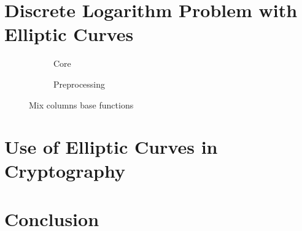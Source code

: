 \documentclass{article}
\begin{document}

\section{Discrete Logarithm Problem with Elliptic Curves}


\begin{figure}[H]
\centering
\begin{subfigure}{.54\textwidth}
  \centering
  \caption{Core}
  \label{fig:core}
\end{subfigure}
\begin{subfigure}{.35\textwidth}
  \centering
  \caption{Preprocessing}
  \label{fig:preprocessing}
\end{subfigure}
\caption{Mix columns base functions}
\label{fig:MixColumns}
\end{figure}
 

\section{Use of Elliptic Curves in Cryptography}



\section{Conclusion}






%

\end{document}

